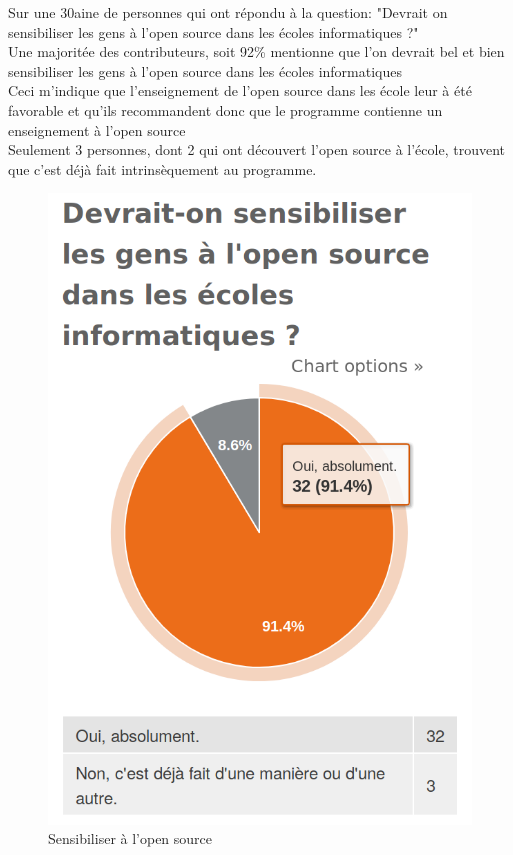 				Sur une 30aine de personnes qui ont répondu à la question: "Devrait on sensibiliser les gens à l'open source dans les écoles informatiques ?"\\

				Une majoritée des contributeurs, soit 92\% mentionne que l'on devrait bel et bien sensibiliser les gens à l'open source dans les écoles informatiques\\

				Ceci m'indique que l'enseignement de l'open source dans les école leur à été favorable et qu'ils recommandent donc que le programme contienne un enseignement à l'open source\\

				Seulement 3 personnes, dont 2 qui ont découvert l'open source à l'école, trouvent que c'est déjà fait intrinsèquement au programme.\\

				\begin{figure}[!htb]
					\center
					\includegraphics[scale=0.28]{./img/a6}
					\caption{Sensibiliser à l'open source}
				\end{figure}

